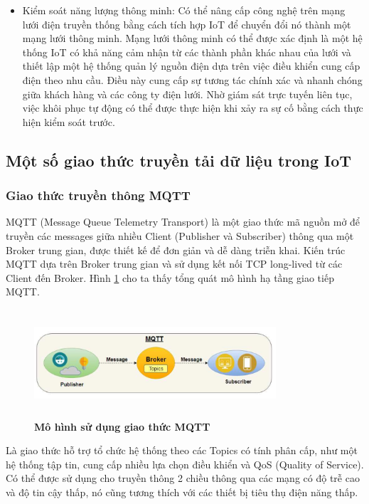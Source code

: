 \documentclass{article} %
\begin{document}
\begin{itemize}
		\item Kiểm soát năng lượng thông minh: Có thể nâng cấp công nghệ trên mạng lưới điện truyền thống bằng cách tích hợp IoT để chuyển đổi nó thành một mạng lưới thông minh. Mạng lưới thông minh có thể được xác định là một hệ thống IoT có khả năng cảm nhận từ các thành phần khác nhau của lưới và thiết lập một hệ thống quản lý nguồn điện dựa trên việc điều khiển cung cấp điện theo nhu cầu. Điều này cung cấp sự tương tác chính xác và nhanh chóng giữa khách hàng và các công ty điện lưới. Nhờ giám sát trực tuyến liên tục, việc khôi phục tự động có thể được thực hiện khi xảy ra sự cố bằng cách thực hiện kiểm soát trước.
	\end{itemize}
	
	\subsection{Một số giao thức truyền tải dữ liệu trong IoT}
	\subsubsection{ Giao thức truyền thông MQTT}
	
	MQTT (Message Queue Telemetry Transport) là một giao thức mã nguồn mở để truyền các messages giữa nhiều Client (Publisher và Subscriber) thông qua một Broker trung gian, được thiết kế để đơn giản và dễ dàng triễn khai. Kiến trúc MQTT dựa trên Broker trung gian và sử dụng kết nối TCP long-lived từ các Client đến Broker. Hình \ref{MQTT} cho ta thấy tổng quát mô hình hạ tầng giao tiếp MQTT.
	
	\begin{figure}[!ht]
		\centering
		\includegraphics[width=9cm,height=4cm]{Images/MQTT.png}
		\caption[Mô hình sử dụng giao thức MQTT\cite{ansari2018internet}]{\bfseries \fontsize{12pt}{0pt}\selectfont Mô hình sử dụng giao thức MQTT\cite{ansari2018internet}}
		\label{MQTT}
	\end{figure}
	\newpage
	Là giao thức hỗ trợ tổ chức hệ thống theo các Topics có tính phân cấp, như một hệ thống tập tin, cung cấp nhiều lựa chọn điều khiển và QoS (Quality of Service). Có thể được sử dụng cho truyền thông 2 chiều thông qua các mạng có độ trễ cao và độ tin cậy thấp, nó cũng tương thích với các thiết bị tiêu thụ điện năng thấp.
	
\end{document}
